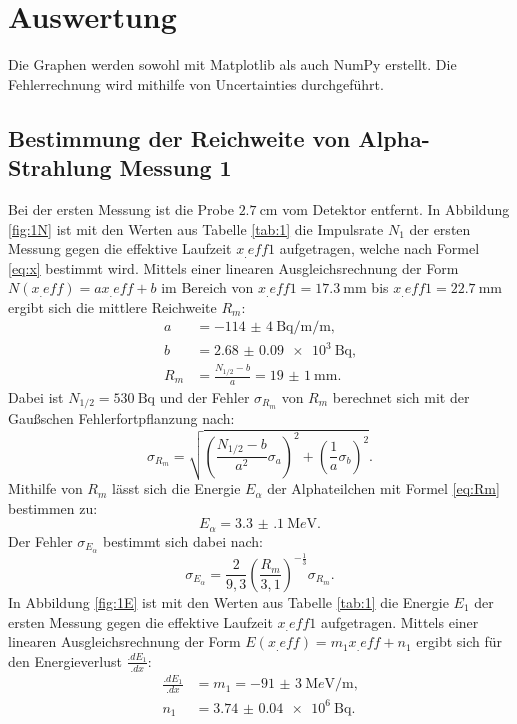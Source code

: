 \section{Auswertung}
\label{sec:Auswertung}

Die Graphen werden sowohl mit Matplotlib \cite{matplotlib} als auch NumPy \cite{numpy} erstellt. Die Fehlerrechnung wird mithilfe von Uncertainties \cite{uncertainties} durchgeführt.

\subsection{Bestimmung der Reichweite von Alpha-Strahlung Messung 1}

Bei der ersten Messung ist die Probe $\SI{2.7}{\centi\metre}$ vom Detektor entfernt.
In Abbildung \ref{fig:1N} ist mit den Werten aus Tabelle \ref{tab:1} die Impulsrate $N_1$ der ersten Messung gegen die effektive Laufzeit $x_.{eff1}$ aufgetragen, welche nach Formel \eqref{eq:x} bestimmt wird.
Mittels einer linearen Ausgleichsrechnung der Form $N(x_.{eff})=a x_.{eff} +b$ im Bereich von $x_.{eff1} = \SI{17.3}{\milli\metre}$ bis $x_.{eff1} = \SI{22.7}{\milli\metre}$ ergibt sich die mittlere Reichweite $R_m$:
\begin{align*}
a	&= \SI{-114(4)}{\becquerel\per\milli\per\metre}\text{,}\\
b	&= \SI{2.68(9)e3}{\becquerel}\text{,}\\
R_m	&= \frac{N_{1/2}-b}{a} = \SI{19(1)}{\milli\metre}\text{.}
\end{align*}
Dabei ist $N_{1/2} = \SI{530}{\becquerel}$ und der Fehler $\sigma_{R_m}$ von $R_m$ berechnet sich mit der Gaußschen Fehlerfortpflanzung nach:
\begin{equation*}
\sigma_{R_m} = \sqrt{\left(\frac{N_{1/2}-b}{a^2}\sigma_a\right)^2+\left(\frac{1}{a}\sigma_b\right)^2}\text{.}
\end{equation*} 
Mithilfe von $R_m$ lässt sich die Energie $E_\alpha$ der Alphateilchen mit Formel \eqref{eq:Rm} bestimmen zu:
\begin{equation*}
E_\alpha = \SI{3.3(1)}{\mega e\volt}\text{.}
\end{equation*} 
Der Fehler $\sigma_{E_\alpha}$ bestimmt sich dabei nach:
\begin{equation*}
\sigma_{E_\alpha} = \frac{2}{9,3}\left(\frac{R_m}{3,1}\right)^{-\frac{1}{3}}\sigma_{R_m}\text{.}
\end{equation*} 
In Abbildung \ref{fig:1E} ist mit den Werten aus Tabelle \ref{tab:1} die Energie $E_1$ der ersten Messung gegen die effektive Laufzeit $x_.{eff1}$ aufgetragen.
Mittels einer linearen Ausgleichsrechnung der Form $E(x_.{eff})=m_1 x_.{eff} +n_1$ ergibt sich für den Energieverlust $\frac{.dE_1}{.dx}$:
\begin{align*}
\frac{.dE_1}{.dx}	&= m_1 = \SI{-91(3)}{\mega e\volt\per\metre}\text{,}\\
n_1	&= \SI{3.74(4)e6}{\becquerel}\text{.}
\end{align*}

